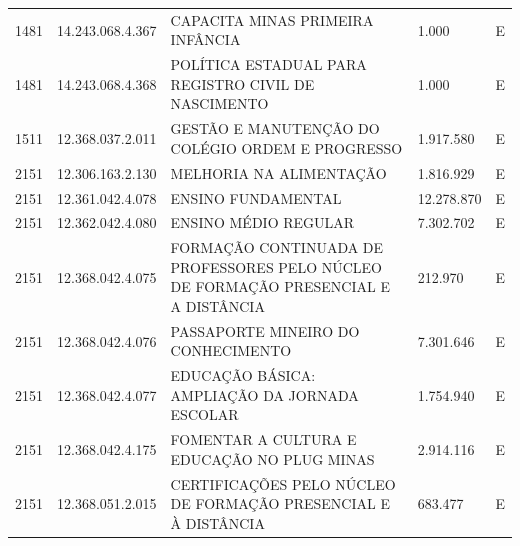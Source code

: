 \documentclass{article}
\begin{document}
\begin{longtable}[c]{m{1cm}|m{2cm}|m{10cm}|m{2cm}|m{1cm}}
\multicolumn{1}{C{1cm}|}{1481} & \multicolumn{1}{C{2cm}|}{14.243.068.4.367} & \multicolumn{1}{L{10cm}|}{CAPACITA MINAS PRIMEIRA INFÂNCIA} & \multicolumn{1}{R{2cm}|}{1.000} & \multicolumn{1}{C{1cm}}{E} \\
\multicolumn{1}{C{1cm}|}{1481} & \multicolumn{1}{C{2cm}|}{14.243.068.4.368} & \multicolumn{1}{L{10cm}|}{POLÍTICA ESTADUAL PARA REGISTRO CIVIL DE NASCIMENTO} & \multicolumn{1}{R{2cm}|}{1.000} & \multicolumn{1}{C{1cm}}{E} \\
\multicolumn{1}{C{1cm}|}{1511} & \multicolumn{1}{C{2cm}|}{12.368.037.2.011} & \multicolumn{1}{L{10cm}|}{GESTÃO E MANUTENÇÃO DO COLÉGIO ORDEM E PROGRESSO} & \multicolumn{1}{R{2cm}|}{1.917.580} & \multicolumn{1}{C{1cm}}{E} \\
\multicolumn{1}{C{1cm}|}{2151} & \multicolumn{1}{C{2cm}|}{12.306.163.2.130} & \multicolumn{1}{L{10cm}|}{MELHORIA NA ALIMENTAÇÃO} & \multicolumn{1}{R{2cm}|}{1.816.929} & \multicolumn{1}{C{1cm}}{E} \\
\multicolumn{1}{C{1cm}|}{2151} & \multicolumn{1}{C{2cm}|}{12.361.042.4.078} & \multicolumn{1}{L{10cm}|}{ENSINO FUNDAMENTAL} & \multicolumn{1}{R{2cm}|}{12.278.870} & \multicolumn{1}{C{1cm}}{E} \\
\multicolumn{1}{C{1cm}|}{2151} & \multicolumn{1}{C{2cm}|}{12.362.042.4.080} & \multicolumn{1}{L{10cm}|}{ENSINO MÉDIO REGULAR} & \multicolumn{1}{R{2cm}|}{7.302.702} & \multicolumn{1}{C{1cm}}{E} \\
\multicolumn{1}{C{1cm}|}{2151} & \multicolumn{1}{C{2cm}|}{12.368.042.4.075} & \multicolumn{1}{L{10cm}|}{FORMAÇÃO CONTINUADA DE PROFESSORES PELO NÚCLEO DE FORMAÇÃO PRESENCIAL E A DISTÂNCIA} & \multicolumn{1}{R{2cm}|}{212.970} & \multicolumn{1}{C{1cm}}{E} \\
\multicolumn{1}{C{1cm}|}{2151} & \multicolumn{1}{C{2cm}|}{12.368.042.4.076} & \multicolumn{1}{L{10cm}|}{PASSAPORTE MINEIRO DO CONHECIMENTO} & \multicolumn{1}{R{2cm}|}{7.301.646} & \multicolumn{1}{C{1cm}}{E} \\
\multicolumn{1}{C{1cm}|}{2151} & \multicolumn{1}{C{2cm}|}{12.368.042.4.077} & \multicolumn{1}{L{10cm}|}{EDUCAÇÃO BÁSICA: AMPLIAÇÃO DA JORNADA ESCOLAR} & \multicolumn{1}{R{2cm}|}{1.754.940} & \multicolumn{1}{C{1cm}}{E} \\
\multicolumn{1}{C{1cm}|}{2151} & \multicolumn{1}{C{2cm}|}{12.368.042.4.175} & \multicolumn{1}{L{10cm}|}{FOMENTAR A CULTURA E EDUCAÇÃO NO PLUG MINAS} & \multicolumn{1}{R{2cm}|}{2.914.116} & \multicolumn{1}{C{1cm}}{E} \\
\multicolumn{1}{C{1cm}|}{2151} & \multicolumn{1}{C{2cm}|}{12.368.051.2.015} & \multicolumn{1}{L{10cm}|}{CERTIFICAÇÕES PELO NÚCLEO DE FORMAÇÃO PRESENCIAL E À DISTÂNCIA} & \multicolumn{1}{R{2cm}|}{683.477} & \multicolumn{1}{C{1cm}}{E} \\

\end{longtable}
\end{document}
